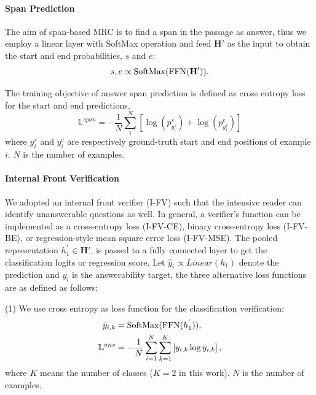 \documentclass[letterpaper]{article} %
\begin{document}
\paragraph{Span Prediction}
The aim of span-based MRC is to find a span in the passage as answer, thus we employ a linear layer with SoftMax operation and feed $\textbf{H}'$ as the input to obtain the start and end probabilities, $s$ and $e$:
\begin{equation}
s, e \propto \textup{SoftMax}(\textup{FFN}(\textbf{H}')).
\end{equation}

The training objective of answer span prediction is defined as cross entropy loss for the start and end predictions, 
\begin{equation}
\mathbb{L}^{span} = -\frac{1}{N}\sum_{i}^{N}[\log (p_{y^{s}_{i}}^s)+\log (p_{y^{e}_{i}}^e)]
\end{equation}
where $y^{s}_{i}$ and $y^{e}_{i}$ are respectively ground-truth start and end positions of example $i$. $N$ is the number of examples.

\paragraph{Internal Front Verification}\label{RV}
We adopted an internal front verifier (I-FV) such that the intensive reader can identify unanswerable questions as well. In general, a verifier's function can be implemented as  a cross-entropy loss (I-FV-CE), binary cross-entropy loss (I-FV-BE), or regression-style mean square error loss (I-FV-MSE). %
The pooled representation $h^{'}_{1} \in \textbf{H}'$, is passed to a fully connected layer to get the classification logits or regression score.  Let $\hat{y}_{i}  \propto \textit{Linear}(h_1)$ denote the prediction and $y_{i}$ is the answerability target, the three alternative loss functions are as defined as follows:

(1) We use cross entropy as loss function for the classification verification: 
\begin{equation}
\begin{split}
\bar{y}_{i,k} &= \textup{SoftMax}(\textup{FFN}(h^{'}_{1})),\\
\mathbb{L}^{ans} &= -\frac{1}{N}\sum_{i=1}^{N}\sum_{k=1}^{K}\left [ {y}_{i,k}\log\bar{y}_{i,k} \right ],
\end{split}
\end{equation}
where $K$ means the number of classes ($K=2$ in this work). $N$ is the number of examples.
\end{document}
